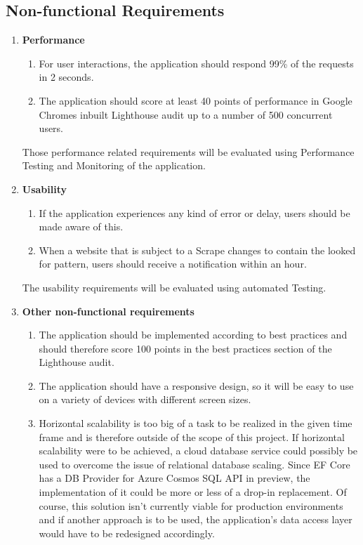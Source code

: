 \documentclass[titlepage, 12pt]{article}
\begin{document}
\subsection{Non-functional Requirements}

\begin{enumerate}
  \item \textbf{Performance}
        \begin{enumerate}
          \item For user interactions, the application should respond 99\% of the requests in 2 seconds.
          \item The application should score at least 40 points of performance in Google Chromes inbuilt Lighthouse audit up to a number of 500 concurrent users.
        \end{enumerate}
        Those performance related requirements will be evaluated using Performance Testing and Monitoring of the application.
  \item \textbf{Usability}
        \begin{enumerate}
          \item If the application experiences any kind of error or delay, users should be made aware of this.
          \item When a website that is subject to a Scrape changes to contain the looked for pattern, users should receive a notification within an hour.
        \end{enumerate}
        The usability requirements will be evaluated using automated Testing.
  \item \textbf{Other non-functional requirements}
        \begin{enumerate}
          \item The application should be implemented according to best practices and should therefore score 100 points in the best practices section of the Lighthouse audit.
          \item The application should have a responsive design, so it will be easy to use on a variety of devices with different screen sizes.
          \item Horizontal scalability is too big of a task to be realized in the given time frame and is therefore outside of the scope of this project. If horizontal scalability were to be achieved, a cloud database service could possibly be used to overcome the issue of relational database scaling. Since EF Core has a DB Provider for Azure Cosmos SQL API in preview, the implementation of it could be more or less of a drop-in replacement. Of course, this solution isn't currently viable for production environments and if another approach is to be used, the application's data access layer would have to be redesigned accordingly.\\

\end{enumerate}
\end{enumerate}
\end{document}
